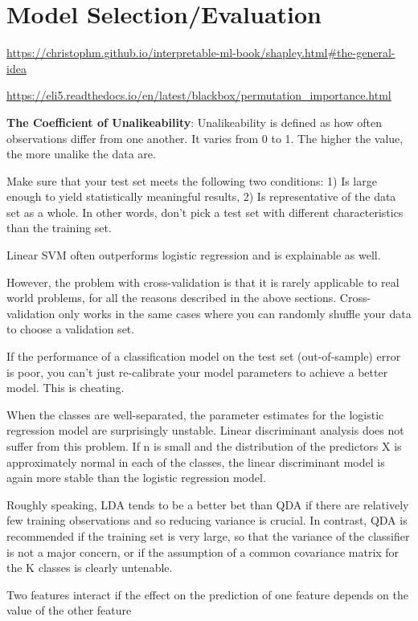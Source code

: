 \documentclass[]{book}
\begin{document}
\hypertarget{model-selectionevaluation}{%
\section{Model Selection/Evaluation}\label{model-selectionevaluation}}

\url{https://christophm.github.io/interpretable-ml-book/shapley.html\#the-general-idea}

\url{https://eli5.readthedocs.io/en/latest/blackbox/permutation_importance.html}

\textbf{The Coefficient of Unalikeability}: Unalikeability is defined as how often observations differ from one another. It varies from 0 to 1. The higher the value, the more unalike the data are.

Make sure that your test set meets the following two conditions: 1) Is large enough to yield statistically meaningful results, 2) Is representative of the data set as a whole. In other words, don't pick a test set with different characteristics than the training set.

Linear SVM often outperforms logistic regression and is explainable as well.

However, the problem with cross-validation is that it is rarely applicable to real world problems, for all the reasons described in the above sections. Cross-validation only works in the same cases where you can randomly shuffle your data to choose a validation set.

If the performance of a classification model on the test set (out-of-sample) error is poor, you can't just re-calibrate your model parameters to achieve a better model. This is cheating.

When the classes are well-separated, the parameter estimates for the logistic regression model are surprisingly unstable. Linear discriminant analysis does not suffer from this problem. If n is small and the distribution of the predictors X is approximately normal in each of the classes, the linear discriminant model is again more stable than the logistic regression model.

Roughly speaking, LDA tends to be a better bet than QDA if there are relatively few training observations and so reducing variance is crucial. In contrast, QDA is recommended if the training set is very large, so that the variance of the classifier is not a major concern, or if the assumption of a common covariance matrix for the K classes is clearly untenable.

Two features interact if the effect on the prediction of one feature depends on the value of the other feature
\end{document}
